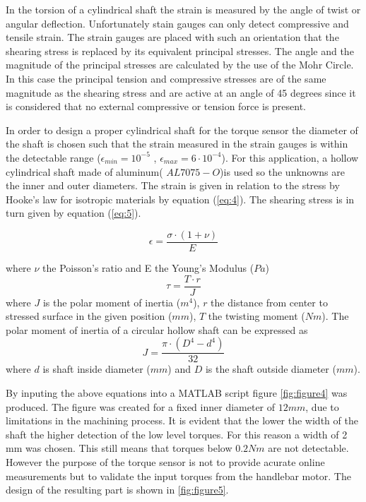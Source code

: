 In the torsion of a cylindrical shaft the strain is measured by the angle of twist or angular deflection. Unfortunately stain gauges can only detect compressive and tensile strain. The strain gauges are placed with such an orientation that the shearing stress is replaced by its equivalent principal stresses. The angle and the magnitude of the principal stresses are calculated by the use of the Mohr Circle. In this case the principal tension and compressive stresses are of the same magnitude as the shearing stress and are active at an angle of 45 degrees since it is  considered that no external compressive or tension force is present. 

In order to design a proper cylindrical shaft for the torque sensor the diameter of the shaft is chosen such that the strain measured in the strain gauges is within the detectable range (\ensuremath{\epsilon_{min}=10^{-5}} , \ensuremath{\epsilon_{max}=6\cdot10^{-4}}). For this application,  a hollow cylindrical shaft made of aluminum( \ensuremath{AL7075-O})is used so the unknowns are the inner and outer diameters. The strain is given in relation to the stress by Hooke’s law for isotropic materials by equation (\ref{eq:4}). The shearing stress is in turn given by equation (\ref{eq:5}). 


\begin{equation}
\epsilon=\frac{\sigma\cdot (1+\nu)}{E}
\label{eq:4}
\end{equation}

where \ensuremath{\nu} the Poisson's ratio and E the Young's Modulus (\ensuremath{Pa})
\begin{equation}
\tau=\frac{T\cdot r}{J}
\label{eq:5}
\end{equation}
where \ensuremath{J} is the polar moment of inertia (\ensuremath{m^4}), \ensuremath{r} the distance from center to stressed surface in the given position (\ensuremath{mm}), \ensuremath{T} the twisting moment (\ensuremath{Nm}).
 The polar moment of inertia of a circular hollow shaft can be expressed as
\begin{equation}
J = \frac{\pi \cdot (D^4 - d^4)} {32}                          
\label{eq:6}
\end{equation}
where \ensuremath{d} is shaft inside diameter (\ensuremath{mm}) and \ensuremath{D} is the shaft outside diameter (\ensuremath{mm}).

By inputing the above equations into a MATLAB script figure \ref{fig:figure4} was produced. The figure was created for a fixed inner diameter of \ensuremath{12 mm}, due to limitations in the machining process. It is evident that the lower the width of the shaft the higher detection of the low level torques. For this reason a width of 2 mm was chosen. This still means that  torques below \ensuremath{0.2 Nm } are not detectable. However the purpose of the torque sensor is not to provide acurate online measurements but to validate the input torques from the handlebar motor. The design of the resulting part is shown in \ref{fig:figure5}. 


